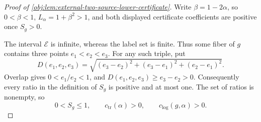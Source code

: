 \begin{proof}[Proof of \cref{obj:lem:external-two-source-lower-certificate}]
Write \(\beta=1-2\alpha\), so \(0<\beta<1\), \(L_\alpha=1+\beta^2>1\), and both displayed certificate coefficients are positive once \(S_g>0\).

The interval \(\mathcal E\) is infinite, whereas the label set is finite. Thus some fiber of \(g\) contains three points \(e_1<e_2<e_3\). For any such triple, put
\[
D(e_1,e_2,e_3)
=\sqrt{(e_3-e_2)^2+(e_3-e_1)^2+(e_2-e_1)^2}.
\]
Overlap gives \(0<e_1/e_2<1\), and \(D(e_1,e_2,e_3)\ge e_3-e_2>0\). Consequently every ratio in the definition of \(S_g\) is positive and at most one. The set of ratios is nonempty, so
\[
0<S_g\le1,\qquad c_{\mathrm{tr}}(\alpha)>0,\qquad
c_{\mathrm{log}}(g,\alpha)>0.
\]


\end{proof}
